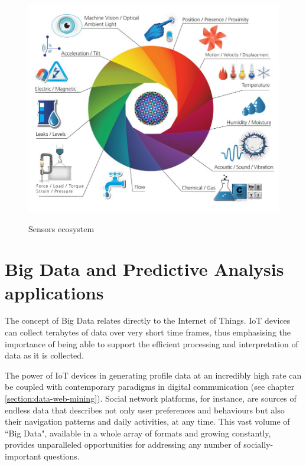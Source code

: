 \begin{itemize}
  \vspace{0.5cm}
  \begin{figure}[htbp]
    \centering
      \includegraphics[height=10cm]{images/iot-sensors.jpg}
    \caption{Sensors ecosystem}
    \label{fig:sensors}
  \end{figure}
  \vspace{0.5cm}

\end{itemize} 

\section{Big Data and Predictive Analysis applications}

The concept of Big Data relates directly to the Internet of Things. IoT devices can collect terabytes of data over very short time frames, thus emphasising the importance of being able to support the efficient processing and interpretation of data as it is collected.

The power of IoT devices in generating profile data at an incredibly high rate can be coupled with contemporary paradigms in digital communication (see chapter \ref{section:data-web-mining}). Social network platforms, for instance, are sources of endless data that describes not only user preferences and behaviours but also their navigation patterns and daily activities, at any time. This vast volume of ``Big Data", available in a whole array of formats and growing constantly, provides unparalleled opportunities for addressing any number of socially-important questions.

